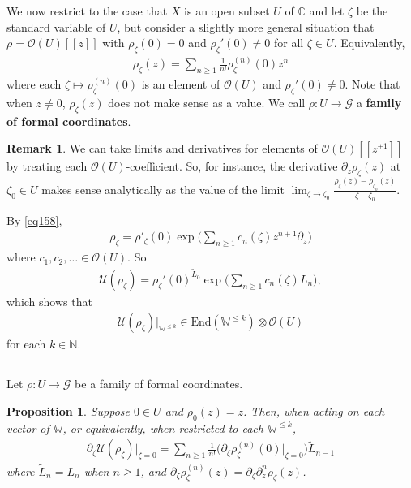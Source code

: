 \documentclass[12pt,a4paper,notitlepage]{article}
\theoremstyle{definition}
\newtheorem{rem}[df]{Remark}
\theoremstyle{plain}
\newtheorem{pp}[df]{Proposition}
\newcommand{\mc}{\mathcal}
\newcommand{\wtd}{\widetilde}
\newcommand{\End}{\mathrm{End}} %
\newcommand{\scr}{\mathscr}
\newcommand{\Wbb}{\mathbb W}
\newcommand{\Cbb}{\mathbb C}
\newcommand{\Nbb}{\mathbb N}
\numberwithin{equation}{section}
\begin{document}
We now restrict to the case that $X$ is an open subset $U$ of $\Cbb$ and let $\zeta$ be the standard variable of $U$, but consider a slightly more general situation that $\rho=\scr O(U)[[z]]$ with $\rho_\zeta(0)=0$ and $\rho_\zeta'(0)\neq0$ for all $\zeta\in U$. Equivalently,
\begin{align}
	\rho_\zeta(z)=\sum_{n\geq 1}\frac 1{n!}\rho_\zeta^{(n)}(0)z^n
\end{align}
where each $\zeta\mapsto\rho_\zeta^{(n)}(0)$ is an element of $\scr O(U)$ and $\rho_\zeta'(0)\neq0$. Note that when $z\neq0$, $\rho_\zeta(z)$ does not make sense as a value. We call $\rho:U\rightarrow\mc G$ a \textbf{family of formal coordinates}.

\begin{rem}\label{lb96}
We can take limits and derivatives for elements of $\scr O(U)[[z^{\pm1}]]$ by treating each $\scr O(U)$-coefficient. So, for instance, the derivative $\partial_z\rho_\zeta(z)$ at $\zeta_0\in U$ makes sense analytically as the value of the limit $\lim_{\zeta\rightarrow\zeta_0}\frac{\rho_\zeta(z)-\rho_{\zeta_0}(z)}{\zeta-\zeta_0}$.
\end{rem}

By \eqref{eq158},
\begin{align}
	\rho_\zeta=\rho'_\zeta(0)\exp\Big(\sum_{n\geq 1}c_n(\zeta)z^{n+1}\partial_z\Big)	\label{eq165}
\end{align}
where $c_1,c_2,\dots\in\scr O(U)$. So
\begin{align}
\mc U(\rho_\zeta)=\rho_\zeta'(0)^{\wtd L_0}\exp\Big(\sum_{n\geq 1}c_n(\zeta)L_n\Big),\label{eq167}
\end{align}
which shows that
\begin{align}
	\mc U(\rho_\zeta)\big|_{\Wbb^{\leq k}}\in\End(\Wbb^{\leq k})\otimes\scr O(U)\label{eq170}	
\end{align}
for each $k\in\Nbb$.

\subsection{}


Let $\rho:U\rightarrow\mc G$ be a family of formal coordinates.

\begin{pp}\label{lb98}
Suppose $0\in U$ and $\rho_0(z)=z$. Then, when acting on each vector of $\Wbb$, or equivalently, when restricted to each $\Wbb^{\leq k}$,
\begin{align}
	\partial_\zeta \mc U(\rho_\zeta)\Big|_{\zeta=0}=\sum_{n\geq 1}\frac 1{n!}\Big(\partial_\zeta\rho_\zeta^{(n)}(0)\Big|_{\zeta=0}\Big) \wtd L_{n-1}\label{eq166}
\end{align}
where $\wtd L_n=L_n$ when $n\geq 1$, and $\partial_\zeta\rho^{(n)}_\zeta(z)=\partial_\zeta\partial_z^n\rho_\zeta(z)$.
\end{pp}
\end{document}
